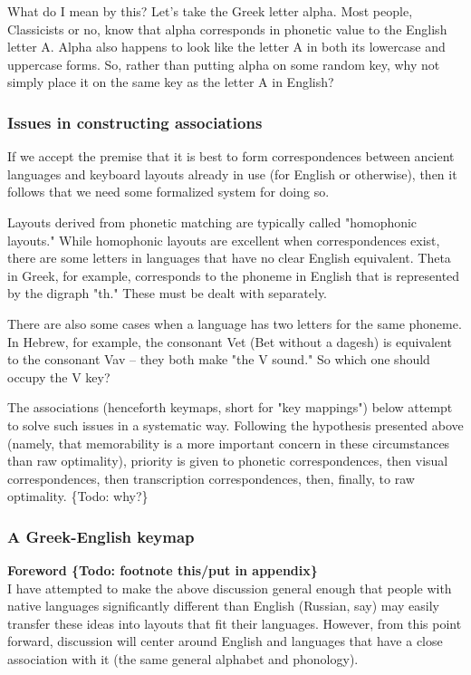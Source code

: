 \documentclass[11pt]{article}
\begin{document}
What do I mean by this? Let's take the Greek letter alpha. Most people, Classicists or no, know that alpha corresponds in phonetic value to the English letter A. Alpha also happens to look like the letter A in both its lowercase and uppercase forms. So, rather than putting alpha on some random key, why not simply place it on the same key as the letter A in English?

\subsubsection{Issues in constructing associations}
\label{sec:orgd6a0cb1}

If we accept the premise that it is best to form correspondences between ancient languages and keyboard layouts already in use (for English or otherwise), then it follows that we need some formalized system for doing so.

Layouts derived from phonetic matching are typically called "homophonic layouts." While homophonic layouts are excellent when correspondences exist, there are some letters in languages that have no clear English equivalent. Theta in Greek, for example, corresponds to the phoneme in English that is represented by the digraph "th." These must be dealt with separately.

There are also some cases when a language has two letters for the same phoneme. In Hebrew, for example, the consonant Vet (Bet without a dagesh) is equivalent to the consonant Vav -- they both make "the V sound." So which one should occupy the V key?

The associations (henceforth keymaps, short for "key mappings") below attempt to solve such issues in a systematic way. Following the hypothesis presented above (namely, that memorability is a more important concern in these circumstances than raw optimality), priority is given to phonetic correspondences, then visual correspondences, then transcription correspondences, then, finally, to raw optimality. \{Todo: why?\}

\subsubsection{A Greek-English keymap}
\label{sec:orga77f57c}

\noindent \textbf{Foreword \{Todo: footnote this/put in appendix\}} \\

I have attempted to make the above discussion general enough that people with native languages significantly different than English (Russian, say) may easily transfer these ideas into layouts that fit their languages. However, from this point forward, discussion will center around English and languages that have a close association with it (the same general alphabet and phonology). \\
\end{document}
